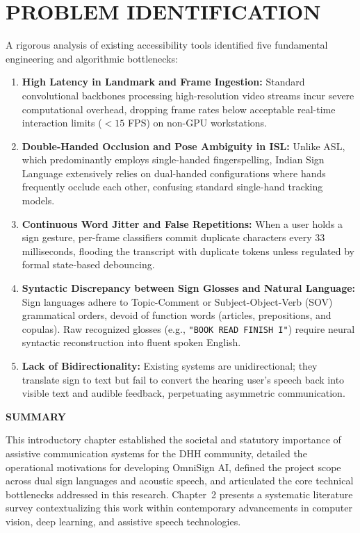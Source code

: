 \documentclass[12pt,a4paper]{report}
\begin{document}
\section{PROBLEM IDENTIFICATION} \label{sec:intro-prob}
A rigorous analysis of existing accessibility tools identified five fundamental engineering and algorithmic bottlenecks:
\begin{enumerate}[noitemsep, topsep=2pt]
\item \textbf{High Latency in Landmark and Frame Ingestion:} Standard convolutional backbones processing high-resolution video streams incur severe computational overhead, dropping frame rates below acceptable real-time interaction limits ($<15$ FPS) on non-GPU workstations.
\item \textbf{Double-Handed Occlusion and Pose Ambiguity in ISL:} Unlike ASL, which predominantly employs single-handed fingerspelling, Indian Sign Language extensively relies on dual-handed configurations where hands frequently occlude each other, confusing standard single-hand tracking models.
\item \textbf{Continuous Word Jitter and False Repetitions:} When a user holds a sign gesture, per-frame classifiers commit duplicate characters every 33 milliseconds, flooding the transcript with duplicate tokens unless regulated by formal state-based debouncing.
\item \textbf{Syntactic Discrepancy between Sign Glosses and Natural Language:} Sign languages adhere to Topic-Comment or Subject-Object-Verb (SOV) grammatical orders, devoid of function words (articles, prepositions, and copulas). Raw recognized glosses (e.g., \texttt{"BOOK READ FINISH I"}) require neural syntactic reconstruction into fluent spoken English.
\item \textbf{Lack of Bidirectionality:} Existing systems are unidirectional; they translate sign to text but fail to convert the hearing user's speech back into visible text and audible feedback, perpetuating asymmetric communication.
\end{enumerate}
\vspace{0.2cm}
\noindent\textbf{SUMMARY}\nopagebreak\par\vspace{0.1cm}
This introductory chapter established the societal and statutory importance of assistive communication systems for the DHH community, detailed the operational motivations for developing OmniSign AI, defined the project scope across dual sign languages and acoustic speech, and articulated the core technical bottlenecks addressed in this research. Chapter~2 presents a systematic literature survey contextualizing this work within contemporary advancements in computer vision, deep learning, and assistive speech technologies.
\clearpage
\end{document}
